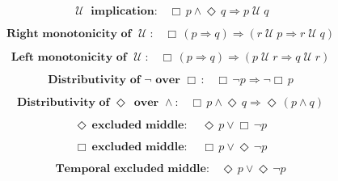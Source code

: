 \documentclass[12pt, fleqn, leqno]{article}
\newcommand{\impl}{\ensuremath{\Rightarrow}}        %
\newcommand{\Until}{\;\mathcal{U}\;}
\newcommand{\Event}{\Diamond\,}
\newcommand{\Always}{\Box\,}
\newcommand{\spacer}{\vspace{-30pt}}
\begin{document}
\spacer

\begin{equation}\label{E:axiomUntilImpl}
\textbf{$\Until$ implication:}\quad \Always p \land \Event q \impl p \Until q
\end{equation}

\spacer

\begin{equation}\label{E:rightMonoUntil}
\textbf{Right monotonicity of $\Until$:}\quad \Always (p \impl q) \impl (r \Until p \impl r \Until q)
\end{equation}

\spacer

\begin{equation}\label{E:leftMonoUntil}
\textbf{Left monotonicity of $\Until$:}\quad \Always (p \impl q) \impl (p \Until r \impl q \Until r)
\end{equation}

\spacer

\begin{equation}\label{E:exAlwaysNot}
\textbf{Distributivity of $\neg$ over $\Always$:}\quad \Always\neg p \impl \neg\Always p
\end{equation}

\spacer

\begin{equation}\label{E:alwaysAndEvent}
\textbf{Distributivity of $\Event$ over $\land$:}\quad \Always p \land \Event q \impl \Event (p \land q)
\end{equation}

\spacer

\begin{equation}\label{E:excludedMid}
\textbf{$\Event$ excluded middle:}\quad \Event p \lor \Always\neg p
\end{equation}

\spacer

\begin{equation}\label{E:excludedMidb}
\textbf{$\Always$ excluded middle:}\quad \Always p \lor \Event\neg p
\end{equation}

\spacer

\begin{equation}\label{E:excludedMidc}
\textbf{Temporal excluded middle:}\quad \Event p \lor \Event\neg p
\end{equation}
\end{document}
